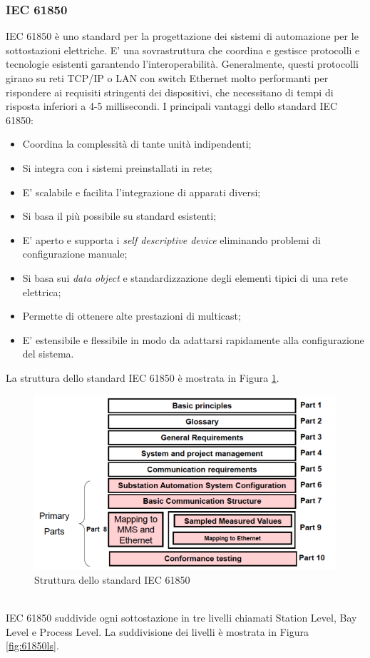 \subsubsection{IEC 61850}
IEC 61850 è uno standard per la progettazione dei sistemi di automazione per le sottostazioni elettriche. E' una sovrastruttura che coordina e gestisce protocolli e tecnologie esistenti garantendo l'interoperabilità. Generalmente, questi protocolli girano su reti TCP/IP o LAN con switch Ethernet molto performanti per rispondere ai requisiti stringenti dei dispositivi, che necessitano di tempi di risposta inferiori a 4-5 millisecondi.\newline\newline
I principali vantaggi dello standard IEC 61850:
\begin{itemize}
	\item Coordina la complessità di tante unità indipendenti;
	\item Si integra con i sistemi preinstallati in rete;
	\item E' scalabile e facilita l'integrazione di apparati diversi;
	\item Si basa il più possibile su standard esistenti;
	\item E' aperto e supporta i \emph{self descriptive device} eliminando problemi di configurazione manuale;
	\item Si basa sui \emph{data object} e standardizzazione degli elementi tipici di una rete elettrica;
	\item Permette di ottenere alte prestazioni di multicast;
	\item E' estensibile e flessibile in modo da adattarsi rapidamente alla configurazione del sistema.
\end{itemize}
\newpage
La struttura dello standard IEC 61850\cite{iec61850} è mostrata in Figura \ref{fig:iec61850}.
\begin{figure}[h]
	\centering
	\includegraphics[scale=0.400]{imgs/iec61850.png}
	\caption{Struttura dello standard IEC 61850} \label{fig:iec61850}
\end{figure}\\
IEC 61850 suddivide ogni sottostazione in tre livelli\cite{iec61850} chiamati Station Level, Bay Level e Process Level. La suddivisione dei livelli è mostrata in Figura \ref{fig:61850ls}.

